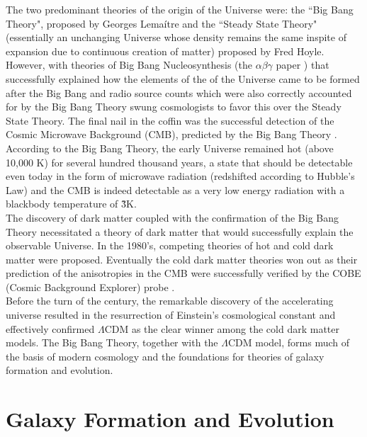The two predominant theories of the origin of the Universe were: the ``Big Bang Theory", proposed by Georges Lema{\'i}tre and the ``Steady State Theory" (essentially an unchanging Universe whose density remains the same inspite of expansion due to continuous creation of matter) proposed by Fred Hoyle. However, with theories of Big Bang Nucleosynthesis (the $\alpha\beta\gamma$ paper \citep{alpher_origin_1948}) that successfully explained how the elements of the of the Universe came to be formed after the Big Bang and radio source counts which were also correctly accounted for by the Big Bang Theory swung cosmologists to favor this over the Steady State Theory. The final nail in the coffin was the successful detection of the Cosmic Microwave Background (CMB), predicted by the Big Bang Theory \citep{1965ApJ...142..419P}. According to the Big Bang Theory, the early Universe remained hot (above 10,000 K) for several hundred thousand years, a state that should be detectable even today in the form of microwave radiation (redshifted according to Hubble's Law) and the CMB is indeed detectable as a very low energy radiation with a blackbody temperature of \~ 3K.\\

The discovery of dark matter coupled with the confirmation of the Big Bang Theory necessitated a theory of dark matter that would successfully explain the observable Universe. In the 1980's, competing theories of hot and cold dark matter \citep{1985ApJ...292..371D} were proposed. Eventually the cold dark matter theories won out as their prediction of the anisotropies in the CMB \citep{peebles_large-scale_1982} were successfully verified by the COBE (Cosmic Background Explorer) probe \citep{riess_observational_1998}.\\

Before the turn of the century, the remarkable discovery of the accelerating universe \citep{Riess:1998cb} resulted in the resurrection of Einstein's cosmological constant and effectively confirmed $\Lambda$CDM as the clear winner among the cold dark matter models. The Big Bang Theory, together with the $\Lambda$CDM model, forms much of the basis of modern cosmology and the foundations for theories of galaxy formation and evolution.\\

\section{Galaxy Formation and Evolution}

